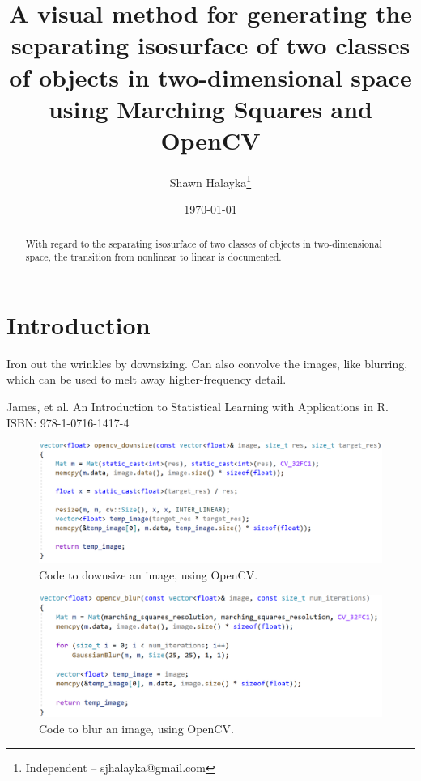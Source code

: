 \documentclass[12pt]{article}
\title{A visual method for generating the separating isosurface of two classes of objects in two-dimensional space using Marching Squares and OpenCV}
\author{
Shawn Halayka\footnote{Independent -- sjhalayka@gmail.com}
}
\date{\today\;\currenttime}
\begin{document}
\maketitle

\begin{abstract}
With regard to the separating isosurface of two classes of objects in two-dimensional space, the transition from nonlinear to linear is documented.
\end{abstract}




\section{Introduction}

Iron out the wrinkles by downsizing.
Can also convolve the images, like blurring, which can be used to melt away higher-frequency detail.

\pagebreak





\begin{thebibliography}{9}

 James, et al. An Introduction to Statistical Learning with Applications in R. ISBN: 978-1-0716-1417-4

\end{thebibliography}





\pagebreak


\begin{figure} 
\centering
  \includegraphics[width = 7 in]{downsize_code.png}
  \caption{Code to downsize an image, using OpenCV.
}
\end{figure}

\begin{figure} 
\centering
  \includegraphics[width = 7 in]{blur_code.png}
  \caption{Code to blur an image, using OpenCV.
}
\end{figure}
\end{document}
